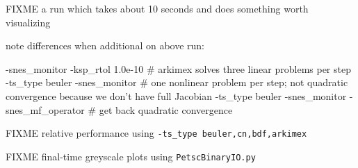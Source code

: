 
FIXME a run which takes about 10 seconds and does something worth visualizing
note differences when additional on above run:
\begin{cline}
-snes_monitor -ksp_rtol 1.0e-10     # arkimex solves three linear problems per step
-ts_type beuler -snes_monitor       # one nonlinear problem per step; not quadratic convergence because we don't have full Jacobian
-ts_type beuler -snes_monitor -snes_mf_operator # get back quadratic convergence
\end{cline}

FIXME relative performance using \texttt{-ts\_type beuler,cn,bdf,arkimex}

FIXME final-time greyscale plots using \texttt{PetscBinaryIO.py}

